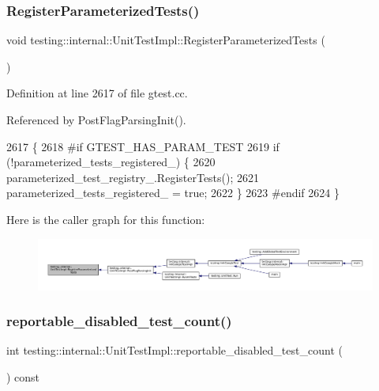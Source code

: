 \subsubsection{\texorpdfstring{Register\+Parameterized\+Tests()}{RegisterParameterizedTests()}}
{\footnotesize\ttfamily void testing\+::internal\+::\+Unit\+Test\+Impl\+::\+Register\+Parameterized\+Tests (\begin{DoxyParamCaption}{ }\end{DoxyParamCaption})}



Definition at line 2617 of file gtest.\+cc.



Referenced by Post\+Flag\+Parsing\+Init().


\begin{DoxyCode}
2617                                               \{
2618 \textcolor{preprocessor}{#if GTEST\_HAS\_PARAM\_TEST}
2619   \textcolor{keywordflow}{if} (!parameterized\_tests\_registered\_) \{
2620     parameterized\_test\_registry\_.RegisterTests();
2621     parameterized\_tests\_registered\_ = \textcolor{keyword}{true};
2622   \}
2623 \textcolor{preprocessor}{#endif}
2624 \}
\end{DoxyCode}
Here is the caller graph for this function\+:
\nopagebreak
\begin{figure}[H]
\begin{center}
\leavevmode
\includegraphics[width=350pt]{classtesting_1_1internal_1_1UnitTestImpl_af84d2515f1a272a8783f00a3e8c0aff8_icgraph}
\end{center}
\end{figure}
\mbox{\label{classtesting_1_1internal_1_1UnitTestImpl_a04827d118a329af68a1de2d6b93eb4e5}} 
\subsubsection{\texorpdfstring{reportable\+\_\+disabled\+\_\+test\+\_\+count()}{reportable\_disabled\_test\_count()}}
{\footnotesize\ttfamily int testing\+::internal\+::\+Unit\+Test\+Impl\+::reportable\+\_\+disabled\+\_\+test\+\_\+count (\begin{DoxyParamCaption}{ }\end{DoxyParamCaption}) const}



